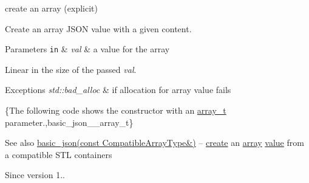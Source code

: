 create an array (explicit) 

Create an array J\+S\+ON value with a given content.


\begin{DoxyParams}[1]{Parameters}
\mbox{\tt in}  & {\em val} & a value for the array\\
\hline
\end{DoxyParams}
Linear in the size of the passed {\itshape val}.


\begin{DoxyExceptions}{Exceptions}
{\em std\+::bad\+\_\+alloc} & if allocation for array value fails\\
\hline
\end{DoxyExceptions}
\{The following code shows the constructor with an \hyperlink{classnlohmann_1_1basic__json_ab00b882d39306d663c23dab110f5cae0}{array\+\_\+t} parameter.,basic\+\_\+json\+\_\+\+\_\+array\+\_\+t\}

\begin{DoxySeeAlso}{See also}
\hyperlink{classnlohmann_1_1basic__json_a81aaaab0f3b326afda2d226daab4f1e1}{basic\+\_\+json(const Compatible\+Array\+Type\&)} -- \hyperlink{classnlohmann_1_1basic__json_afdb7a485369fbfd8c4c7c134ebb1feb5}{create} an \hyperlink{classnlohmann_1_1basic__json_a5685815624b086caa532f41e853d4b0f}{array} \hyperlink{classnlohmann_1_1basic__json_a407e73a037e6e3067ef7aa2c25a79f39}{value} from a compatible S\+TL containers
\end{DoxySeeAlso}
\begin{DoxySince}{Since}
version 1.. 
\end{DoxySince}
\hypertarget{classnlohmann_1_1basic__json_a81aaaab0f3b326afda2d226daab4f1e1}{}\label{classnlohmann_1_1basic__json_a81aaaab0f3b326afda2d226daab4f1e1} 
